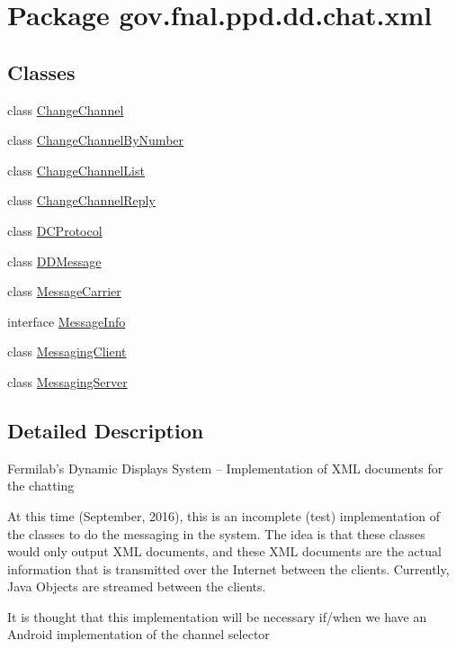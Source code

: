 \hypertarget{namespacegov_1_1fnal_1_1ppd_1_1dd_1_1chat_1_1xml}{\section{Package gov.\-fnal.\-ppd.\-dd.\-chat.\-xml}
\label{namespacegov_1_1fnal_1_1ppd_1_1dd_1_1chat_1_1xml}
}
\subsection*{Classes}
\begin{DoxyCompactItemize}
\item 
class \hyperlink{classgov_1_1fnal_1_1ppd_1_1dd_1_1chat_1_1xml_1_1ChangeChannel}{Change\-Channel}
\item 
class \hyperlink{classgov_1_1fnal_1_1ppd_1_1dd_1_1chat_1_1xml_1_1ChangeChannelByNumber}{Change\-Channel\-By\-Number}
\item 
class \hyperlink{classgov_1_1fnal_1_1ppd_1_1dd_1_1chat_1_1xml_1_1ChangeChannelList}{Change\-Channel\-List}
\item 
class \hyperlink{classgov_1_1fnal_1_1ppd_1_1dd_1_1chat_1_1xml_1_1ChangeChannelReply}{Change\-Channel\-Reply}
\item 
class \hyperlink{classgov_1_1fnal_1_1ppd_1_1dd_1_1chat_1_1xml_1_1DCProtocol}{D\-C\-Protocol}
\item 
class \hyperlink{classgov_1_1fnal_1_1ppd_1_1dd_1_1chat_1_1xml_1_1DDMessage}{D\-D\-Message}
\item 
class \hyperlink{classgov_1_1fnal_1_1ppd_1_1dd_1_1chat_1_1xml_1_1MessageCarrier}{Message\-Carrier}
\item 
interface \hyperlink{interfacegov_1_1fnal_1_1ppd_1_1dd_1_1chat_1_1xml_1_1MessageInfo}{Message\-Info}
\item 
class \hyperlink{classgov_1_1fnal_1_1ppd_1_1dd_1_1chat_1_1xml_1_1MessagingClient}{Messaging\-Client}
\item 
class \hyperlink{classgov_1_1fnal_1_1ppd_1_1dd_1_1chat_1_1xml_1_1MessagingServer}{Messaging\-Server}
\end{DoxyCompactItemize}


\subsection{Detailed Description}
Fermilab's Dynamic Displays System -- Implementation of X\-M\-L documents for the chatting

At this time (September, 2016), this is an incomplete (test) implementation of the classes to do the messaging in the system. The idea is that these classes would only output X\-M\-L documents, and these X\-M\-L documents are the actual information that is transmitted over the Internet between the clients. Currently, Java Objects are streamed between the clients.

It is thought that this implementation will be necessary if/when we have an Android implementation of the channel selector